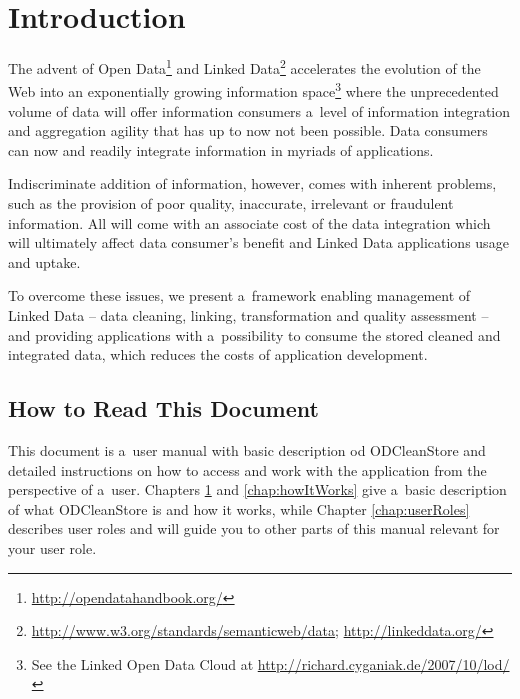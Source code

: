 
\newcommand{\version}{0.1}
\newcommand{\documentname}{\refusermanual}





\renewcommand{\contentsname}{Contents}
\tableofcontents
\bigskip

\newpage


\chapter{Introduction}
\label{chap:introduction}

The advent of Open Data\footnote{\url{http://opendatahandbook.org/}} and Linked Data\footnote{\url{http://www.w3.org/standards/semanticweb/data}; \url{http://linkeddata.org/}}  accelerates the evolution of the Web into an exponentially growing information space\footnote{See the Linked Open Data Cloud at \url{http://richard.cyganiak.de/2007/10/lod/}} where the unprecedented volume of data will offer information consumers a~level of information integration and aggregation agility that has up to now not been possible. Data consumers can now  and readily integrate information in myriads of applications.

Indiscriminate addition of information, however, comes with inherent problems, such as the provision of poor quality, inaccurate, irrelevant or fraudulent information. All will come with an associate cost of the data integration which will ultimately affect data consumer's benefit and Linked Data applications usage and uptake.

To overcome these issues, we present a~framework enabling management of Linked Data -- data cleaning, linking, transformation and quality assessment -- and providing  applications with a~possibility to consume the stored cleaned and integrated data, which reduces the costs of application development.

\section{How to Read This Document}

This document is a~user manual with basic description od ODCleanStore and detailed instructions on how to access and work with the application from the perspective of a~user. Chapters \ref{chap:introduction} and \ref{chap:howItWorks} give a~basic description of what ODCleanStore is and how it works, while Chapter \ref{chap:userRoles} describes user roles and will guide you to other parts of this manual relevant for your user role.

